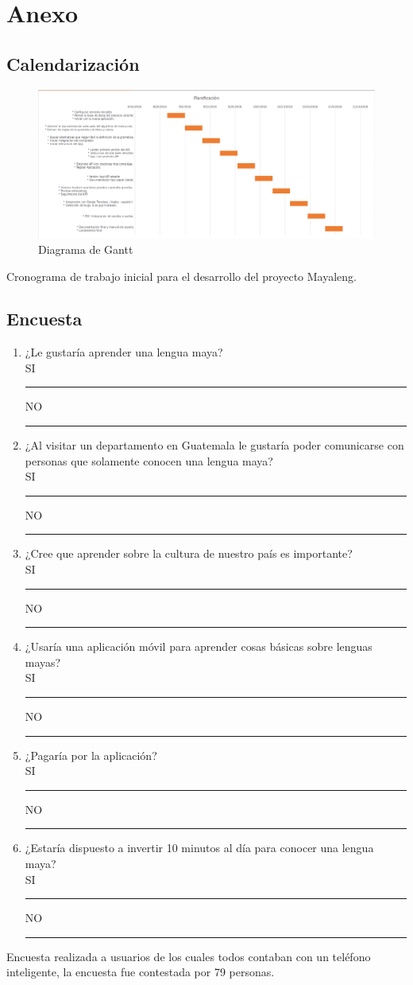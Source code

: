 \documentclass[a4paper,openright,11pt]{article}
\begin{document}
\section{Anexo}
\subsection{Calendarización}
\begin{figure}[h]
  \centering
    \includegraphics[width=1.0\textwidth]{Gantt}
  \caption{Diagrama de Gantt}
  \label{fig:gantt}
\end{figure}
Cronograma de trabajo inicial para el desarrollo del proyecto Mayaleng.

\subsection{Encuesta}
\begin{enumerate}
	\item ¿Le gustaría aprender una lengua maya?\\
	SI \rule{10mm}{0.1mm}  \hspace{5cm} NO \rule{10mm}{0.1mm}
	\item ¿Al visitar un departamento en Guatemala le gustaría poder comunicarse con personas que solamente conocen una lengua maya?	\\
	SI \rule{10mm}{0.1mm}  \hspace{5cm} NO \rule{10mm}{0.1mm}
	\item ¿Cree que aprender sobre la cultura de nuestro país es importante?\\
	SI \rule{10mm}{0.1mm}  \hspace{5cm} NO \rule{10mm}{0.1mm}
	\item ¿Usaría una aplicación móvil para aprender cosas básicas sobre lenguas mayas?\\
	SI \rule{10mm}{0.1mm}  \hspace{5cm} NO \rule{10mm}{0.1mm}
	\item ¿Pagaría por la aplicación?\\
	SI \rule{10mm}{0.1mm}  \hspace{5cm} NO \rule{10mm}{0.1mm}
	\item ¿Estaría dispuesto a invertir 10 minutos al día para conocer una lengua maya?\\
	SI \rule{10mm}{0.1mm}  \hspace{5cm} NO \rule{10mm}{0.1mm}
\end{enumerate}
Encuesta realizada a usuarios de los cuales todos contaban con un teléfono inteligente, la encuesta fue contestada por 79 personas.
\newpage
\end{document}
